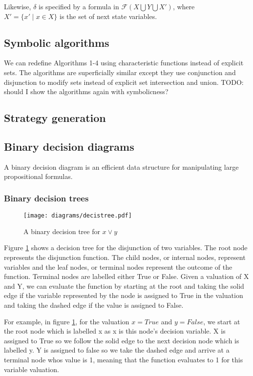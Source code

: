 \documentclass[a4paper,twoside,openright,11pt]{book}
\newcommand{\forms}[0]{\mathcal{F}}
\theoremstyle{definition}
\begin{document}
Likewise, $\delta$ is specified by a formula in $\forms(X \bigcup Y \bigcup X')$, where $X' = \{x' \mid x \in X \}$ is the set of next state variables.

\subsection{Symbolic algorithms}

We can redefine Algorithms 1-4 using characteristic functions instead of explicit sets. The algorithms are superficially similar except they use conjunction and disjunction to modify sets instead of explicit set intersection and union. TODO: should I show the algorithms again with symbolicness?

\subsection{Strategy generation}
\subsection{Binary decision diagrams}

A binary decision diagram is an efficient data structure for manipulating large propositional formulas. 

\subsubsection{Binary decision trees}

\begin{figure}[t]
\centering
\texttt{[image: diagrams/decistree.pdf]}
\caption{A binary decision tree for $x \vee y$}
\label{fig:decis_tree}
\end{figure}

Figure \ref{fig:decis_tree} shows a decision tree for the disjunction of two variables. The root node represents the disjunction function. The child nodes, or internal nodes, represent variables and the leaf nodes, or terminal nodes represent the outcome of the function. Terminal nodes are labelled either True or False. Given a valuation of X and Y, we can evaluate the function by starting at the root and taking the solid edge if the variable represented by the node is assigned to True in the valuation and taking the dashed edge if the value is assigned to False. 

For example, in figure \ref{fig:decis_tree}, for the valuation $x=True$ and $y=False$, we start at the root node which is labelled x as x is this node's decision variable. X is assigned to True so we follow the solid edge to the next decision node which is labelled y. Y is assigned to false so we take the dashed edge and arrive at a terminal node whos value is 1, meaning that the function evaluates to 1 for this variable valuation.
\end{document}
